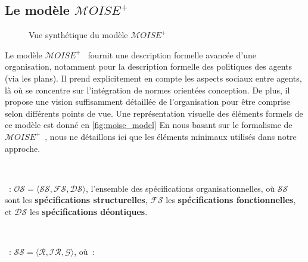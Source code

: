 \subsection{Le modèle $\mathcal{M}OISE^+$}

\begin{figure}[h!]
    \centering
    
    \caption{Vue synthétique du modèle $\mathcal{M}OISE^+$}
    \label{fig:moise_model}
\end{figure}

Le modèle $\mathcal{M}OISE^+$~\citep{Hubner2002} fournit une description formelle avancée d'une organisation, notamment pour la description formelle des politiques des agents (via les plans). Il prend explicitement en compte les aspects sociaux entre agents, là où  se concentre sur l'intégration de normes orientées conception. De plus, il propose une vision suffisamment détaillée de l'organisation pour être comprise selon différents points de vue. Une représentation visuelle des éléments formels de ce modèle est donné en \autoref{fig:moise_model}
En nous basant sur le formalisme de $\mathcal{M}OISE^+$~\citep{hubner2007moise}, nous ne détaillons ici que les éléments minimaux utilisés dans notre approche.

\

\noindent \textbf{}~: \quad $\mathcal{OS} = \langle \mathcal{SS}, \mathcal{FS}, \mathcal{DS} \rangle$, l'ensemble des spécifications organisationnelles, où $\mathcal{SS}$ sont les \textbf{spécifications structurelles}, $\mathcal{FS}$ les \textbf{spécifications fonctionnelles}, et $\mathcal{DS}$ les \textbf{spécifications déontiques}.

\

\noindent \textbf{}~: \quad $\mathcal{SS} = \langle \mathcal{R}, \mathcal{IR}, \mathcal{G} \rangle$, où~:

